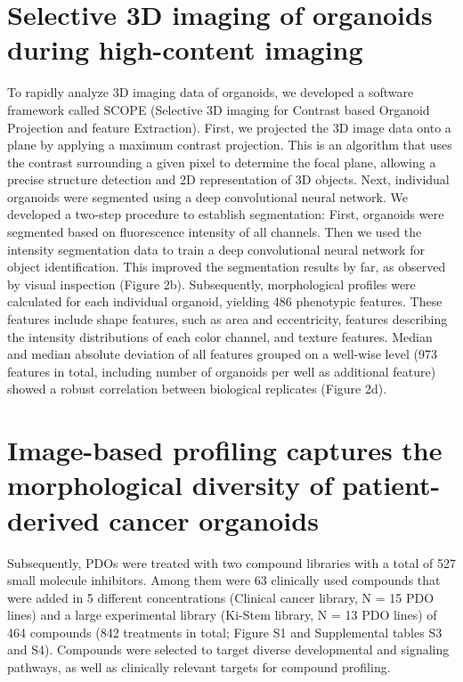 \begin{flushleft}
\section{Selective 3D imaging of organoids during high-content imaging}
To rapidly analyze 3D imaging data of organoids, we developed a software framework called SCOPE (Selective 3D imaging for Contrast based Organoid Projection and feature Extraction). 
First, we projected the 3D image data onto a plane by applying a maximum contrast projection. 
This is an algorithm that uses the contrast surrounding a given pixel to determine the focal plane, allowing a precise structure detection and 2D representation of 3D objects. 
Next, individual organoids were segmented using a deep convolutional neural network. We developed a two-step procedure to establish segmentation: First, organoids were segmented based on fluorescence intensity of all channels. 
Then we used the intensity segmentation data to train a deep convolutional neural network for object identification. 
This improved the segmentation results by far, as observed by visual inspection (Figure 2b).
Subsequently, morphological profiles were calculated for each individual organoid, yielding 486 phenotypic features. 
These features include shape features, such as area and eccentricity, features describing the intensity distributions of each color channel, and texture features. 
Median and median absolute deviation of all features grouped on a well-wise level (973 features in total, including number of organoids per well as additional feature) showed a robust correlation between biological replicates (Figure 2d).

\section{Image-based profiling captures the morphological diversity of patient-derived cancer organoids}

Subsequently, PDOs were treated with two compound libraries with a total of 527 small molecule inhibitors. Among them were 63 clinically used compounds that were added in 5 different concentrations (Clinical cancer library, N = 15 PDO lines) and a large experimental library (Ki-Stem library, N = 13 PDO lines) of 464 compounds (842 treatments in total; Figure S1 and Supplemental tables S3 and S4). 
Compounds were selected to target diverse developmental and signaling pathways, as well as clinically relevant targets for compound profiling. 


\end{flushleft}
